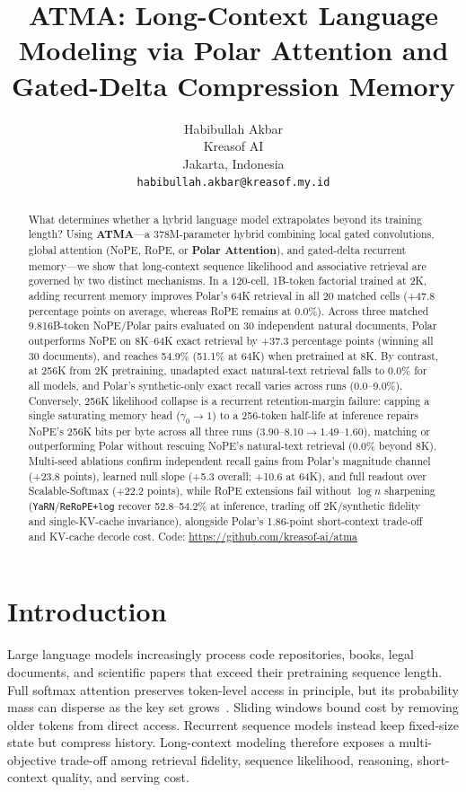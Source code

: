 \documentclass{article}
\title{ATMA: Long-Context Language Modeling via Polar Attention and Gated-Delta Compression Memory}
\author{Habibullah Akbar \\
Kreasof AI \\
Jakarta, Indonesia \\
\texttt{habibullah.akbar@kreasof.my.id}}
\newcommand{\rev}[1]{{\color{revcolor}#1}}
\begin{document}
\maketitle

\begin{abstract}
What determines whether a hybrid language model extrapolates beyond its training length? Using \textbf{ATMA}---a 378M-parameter hybrid combining local gated convolutions, global attention (NoPE, RoPE, or \textbf{Polar Attention}), and gated-delta recurrent memory---\rev{we show that long-context sequence likelihood and associative retrieval are governed by two distinct mechanisms.} In a 120-cell, 1B-token factorial trained at 2K, adding recurrent memory improves Polar's 64K retrieval in all 20 matched cells (+47.8 percentage points on average, whereas RoPE remains at 0.0\%). \rev{Across three matched 9.816B-token NoPE/Polar pairs evaluated on 30 independent natural documents, Polar outperforms NoPE on 8K--64K exact retrieval by +37.3 percentage points (winning all 30 documents), and reaches 54.9\% (51.1\% at 64K) when pretrained at 8K. By contrast, at 256K from 2K pretraining, unadapted exact natural-text retrieval falls to 0.0\% for all models, and Polar's synthetic-only exact recall varies across runs (0.0--9.0\%). Conversely, 256K likelihood collapse is a recurrent retention-margin failure: capping a single saturating memory head ($\gamma_0\rightarrow1$) to a 256-token half-life at inference repairs NoPE's 256K bits per byte across all three runs ($3.90\text{--}8.10\rightarrow1.49\text{--}1.60$), matching or outperforming Polar without rescuing NoPE's natural-text retrieval (0.0\% beyond 8K). Multi-seed ablations confirm independent recall gains from Polar's magnitude channel (+23.8 points), learned null slope (+5.3 overall; +10.6 at 64K), and full readout over Scalable-Softmax (+22.2 points), while RoPE extensions fail without $\log n$ sharpening (\texttt{YaRN}/\texttt{ReRoPE+log} recover 52.8--54.2\% at inference, trading off 2K/synthetic fidelity and single-KV-cache invariance), alongside Polar's 1.86-point short-context trade-off and KV-cache decode cost.}
Code: \url{https://github.com/kreasof-ai/atma}
\end{abstract}

\section{Introduction}

Large language models increasingly process code repositories, books, legal documents, and scientific papers that exceed their pretraining sequence length. Full softmax attention preserves token-level access in principle, but its probability mass can disperse as the key set grows~\citep{nakanishi2025scalable,velickovic2025softmax,barbero2024glasses}. Sliding windows bound cost by removing older tokens from direct access. Recurrent sequence models instead keep fixed-size state but compress history. Long-context modeling therefore exposes a multi-objective trade-off among retrieval fidelity, sequence likelihood, reasoning, short-context quality, and serving cost.
\end{document}
